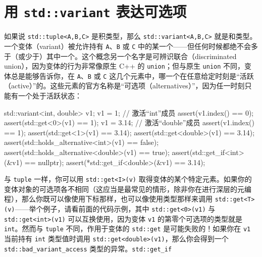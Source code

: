 \section{用 \texttt{std::\allowbreak{}variant} 表达可选项}

如果说 \texttt{std::\allowbreak{}tuple<\allowbreak{}A,\allowbreak{}B,\allowbreak{}C>\allowbreak{}} 是积类型，那么 \texttt{std::\allowbreak{}variant<\allowbreak{}A,\allowbreak{}B,\allowbreak{}C>\allowbreak{}} 就是和类型。一个变体（variant）被允许持有 \texttt{A}、\texttt{B} 或 \texttt{C} 中的某一个——但任何时候都绝不会多于（或少于）其中一个。这个概念另一个名字是可辨识联合（discriminated union），因为变体的行为非常像原生 C++ 的 \texttt{union}；但与原生 \texttt{union} 不同，变体总是能够告诉你，在 \texttt{A}、\texttt{B} 或 \texttt{C} 这几个元素中，哪一个在任意给定时刻是“活跃（active）”的。这些元素的官方名称是“可选项（alternatives）”，因为任一时刻只能有一个处于活跃状态：

\begin{codebox}[cpp]
    std::variant<int, double> v1;
    v1 = 1; // 激活“int”成员
    assert(v1.index() == 0);
    assert(std::get<0>(v1) == 1);
    v1 = 3.14; // 激活“double”成员
    assert(v1.index() == 1);
    assert(std::get<1>(v1) == 3.14);
    assert(std::get<double>(v1) == 3.14);
    assert(std::holds_alternative<int>(v1) == false);
    assert(std::holds_alternative<double>(v1) == true);
    assert(std::get_if<int>(&v1) == nullptr);
    assert(*std::get_if<double>(&v1) == 3.14);
\end{codebox}

与 \texttt{tuple} 一样，你可以用 \texttt{std::\allowbreak{}get<\allowbreak{}I>\allowbreak{}(\allowbreak{}v)\allowbreak{}} 取得变体的某个特定元素。如果你的变体对象的可选项各不相同（这应当是最常见的情形，除非你在进行深层的元编程），那么你既可以像使用下标那样，也可以像使用类型那样来调用 \texttt{std::\allowbreak{}get<\allowbreak{}T>\allowbreak{}(\allowbreak{}v)\allowbreak{}}——举个例子，请看前面的代码示例，其中 \texttt{std::\allowbreak{}get<\allowbreak{}0>\allowbreak{}(\allowbreak{}v1)\allowbreak{}} 与 \texttt{std::\allowbreak{}get<\allowbreak{}int>\allowbreak{}(\allowbreak{}v1)\allowbreak{}} 可以互换使用，因为变体 \texttt{v1} 的第零个可选项的类型就是 \texttt{int}。然而与 \texttt{tuple} 不同，作用于变体的 \texttt{std::\allowbreak{}get} 是可能失败的！如果你在 \texttt{v1} 当前持有 \texttt{int} 类型值时调用 \texttt{std::\allowbreak{}get<\allowbreak{}double>\allowbreak{}(\allowbreak{}v1)\allowbreak{}}，那么你会得到一个 \texttt{std::\allowbreak{}bad\_\allowbreak{}variant\_\allowbreak{}access} 类型的异常。\texttt{std::\allowbreak{}get\_\allowbreak{}if}

